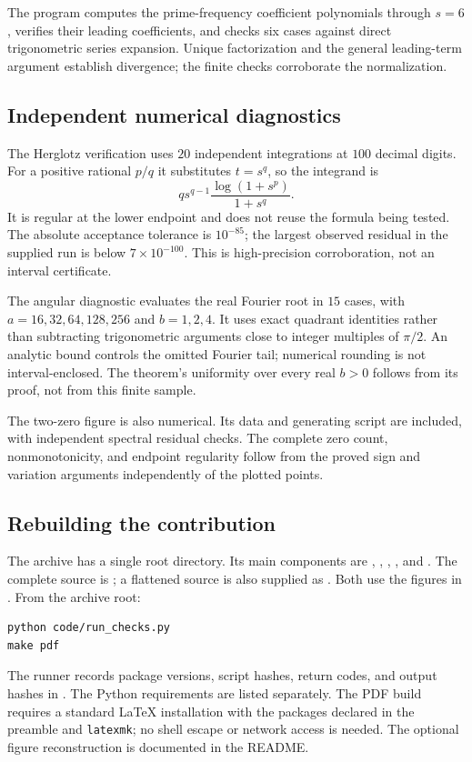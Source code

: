 \documentclass[11pt,a4paper]{article}
\theoremstyle{definition}
\theoremstyle{remark}
\numberwithin{equation}{section}
\begin{document}
\begin{description}[style=nextline,leftmargin=0pt,labelwidth=0pt,labelsep=0pt]
\item[Divergence coefficients.]
The program  computes the
prime-frequency coefficient polynomials through $s=6$, verifies their
leading coefficients, and checks six cases against direct trigonometric
series expansion. Unique factorization and the general leading-term
argument establish divergence; the finite checks corroborate the
normalization.
\end{description}

\subsection{Independent numerical diagnostics}

The Herglotz verification uses $20$ independent integrations at $100$
decimal digits. For a positive rational $p/q$ it substitutes $t=s^q$,
so the integrand is
\[
q s^{q-1}\frac{\log(1+s^p)}{1+s^q}.
\]
It is regular at the lower endpoint and does not reuse the formula
being tested. The absolute acceptance tolerance is $10^{-85}$; the
largest observed residual in the supplied run is below $7\times10^{-100}$.
This is high-precision corroboration, not an interval certificate.

The angular diagnostic evaluates the real Fourier root in $15$ cases,
with $a=16,32,64,128,256$ and $b=1,2,4$. It uses exact quadrant
identities rather than subtracting trigonometric arguments close to
integer multiples of $\pi/2$. An analytic bound controls the omitted
Fourier tail; numerical rounding is not interval-enclosed. The theorem's
uniformity over every real $b>0$ follows from its proof, not from this
finite sample.

The two-zero figure is also numerical. Its data and generating script
are included, with independent spectral residual checks. The complete
zero count, nonmonotonicity, and endpoint regularity follow from the
proved sign and variation arguments independently of the plotted points.

\subsection{Rebuilding the contribution}

The archive has a single root directory. Its main components are
, , , , and
. The complete source is
; a flattened source is also supplied as
. Both use the figures in
. From the archive root:
\begin{verbatim}
python code/run_checks.py
make pdf
\end{verbatim}
The runner records package versions, script hashes, return codes, and
output hashes in . The Python
requirements are listed separately. The PDF build requires a standard
LaTeX installation with the packages declared in the preamble and
\texttt{latexmk}; no shell escape or network access is needed.
The optional figure reconstruction is documented in the README.
\end{document}
